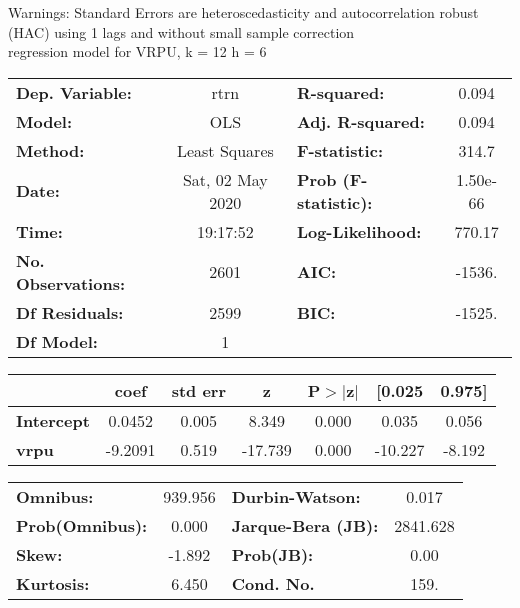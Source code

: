 Warnings: \newline
 [1] Standard Errors are heteroscedasticity and autocorrelation robust (HAC) using 1 lags and without small sample correction\\ 

regression model for VRPU, k = 12 h = 6\begin{center}
\begin{tabular}{lclc}
\toprule
\textbf{Dep. Variable:}    &       rtrn       & \textbf{  R-squared:         } &     0.094   \\
\textbf{Model:}            &       OLS        & \textbf{  Adj. R-squared:    } &     0.094   \\
\textbf{Method:}           &  Least Squares   & \textbf{  F-statistic:       } &     314.7   \\
\textbf{Date:}             & Sat, 02 May 2020 & \textbf{  Prob (F-statistic):} &  1.50e-66   \\
\textbf{Time:}             &     19:17:52     & \textbf{  Log-Likelihood:    } &    770.17   \\
\textbf{No. Observations:} &        2601      & \textbf{  AIC:               } &    -1536.   \\
\textbf{Df Residuals:}     &        2599      & \textbf{  BIC:               } &    -1525.   \\
\textbf{Df Model:}         &           1      & \textbf{                     } &             \\
\bottomrule
\end{tabular}
\begin{tabular}{lcccccc}
                   & \textbf{coef} & \textbf{std err} & \textbf{z} & \textbf{P$> |$z$|$} & \textbf{[0.025} & \textbf{0.975]}  \\
\midrule
\textbf{Intercept} &       0.0452  &        0.005     &     8.349  &         0.000        &        0.035    &        0.056     \\
\textbf{vrpu}      &      -9.2091  &        0.519     &   -17.739  &         0.000        &      -10.227    &       -8.192     \\
\bottomrule
\end{tabular}
\begin{tabular}{lclc}
\textbf{Omnibus:}       & 939.956 & \textbf{  Durbin-Watson:     } &    0.017  \\
\textbf{Prob(Omnibus):} &   0.000 & \textbf{  Jarque-Bera (JB):  } & 2841.628  \\
\textbf{Skew:}          &  -1.892 & \textbf{  Prob(JB):          } &     0.00  \\
\textbf{Kurtosis:}      &   6.450 & \textbf{  Cond. No.          } &     159.  \\
\bottomrule
\end{tabular}
\end{center}

